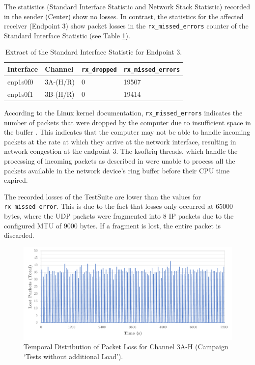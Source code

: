 The statistics (Standard Interface Statistic and Network Stack Statistic) recorded in the sender (Center) show no losses. In contrast, the statistics for the affected receiver (Endpoint 3) show packet losses in the \texttt{rx\_missed\_errors} counter of the Standard Interface Statistic (see Table \ref{tab:ep3InterfaceStat}).

\begin{table}[h]
\centering
\begin{tabular}{l|l|l|l}
	\toprule
	\textbf{Interface} & \textbf{Channel} & \textbf{\texttt{rx\_dropped}} & \textbf{\texttt{rx\_missed\_errors}} \\
	\midrule
 	enp1s0f0 & 3A-(H/R) & 0 & 19507 \\ 
 	enp1s0f1 & 3B-(H/R) & 0 & 19414 \\
	\bottomrule
\end{tabular}
\caption{Extract of the Standard Interface Statistic for Endpoint 3.}
\label{tab:ep3InterfaceStat}
\end{table}

According to the Linux kernel documentation, \texttt{rx\_missed\_errors} indicates the number of packets that were dropped by the computer due to insufficient space in the buffer \cite{sock11}. This indicates that the computer may not be able to handle incoming packets at the rate at which they arrive at the network interface, resulting in network congestion at the endpoint 3. The ksoftriq threads, which handle the processing of incoming packets as described in \label{chap:recpath} were unable to process all the packets available in the network device's ring buffer before their CPU time expired.

The recorded losses of the TestSuite are lower than the values for \texttt{rx\_missed\_error}. This is due to the fact that losses only occurred at 65000 bytes, where the UDP packets were fragmented into 8 IP packets due to the configured MTU of 9000 bytes. If a fragment is lost, the entire packet is discarded.

\begin{figure}[h!]
    \centering
    \includegraphics[width=1\linewidth]{figures/reliability/ihawk/diagr6.pdf}
    \caption{Temporal Distribution of Packet Loss for Channel 3A-H (Campaign `Tests without additional Load').}
    \label{fig:diagr6Temp}
\end{figure}

